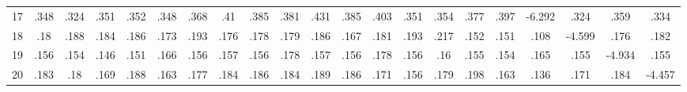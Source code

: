 \begin{table}[htbp]
\begin{tabular}{l*{20}{c}}
17          &        .348&        .324&        .351&        .352&        .348&        .368&         .41&        .385&        .381&        .431&        .385&        .403&        .351&        .354&        .377&        .397&      -6.292&        .324&        .359&        .334\\
18          &         .18&        .188&        .184&        .186&        .173&        .193&        .176&        .178&        .179&        .186&        .167&        .181&        .193&        .217&        .152&        .151&        .108&      -4.599&        .176&        .182\\
19          &        .156&        .154&        .146&        .151&        .166&        .156&        .157&        .156&        .178&        .157&        .156&        .178&        .156&         .16&        .155&        .154&        .165&        .155&      -4.934&        .155\\
20          &        .183&         .18&        .169&        .188&        .163&        .177&        .184&        .186&        .184&        .189&        .186&        .171&        .156&        .179&        .198&        .163&        .136&        .171&        .184&      -4.457\\
\hline\hline
\end{tabular}
\end{table}
